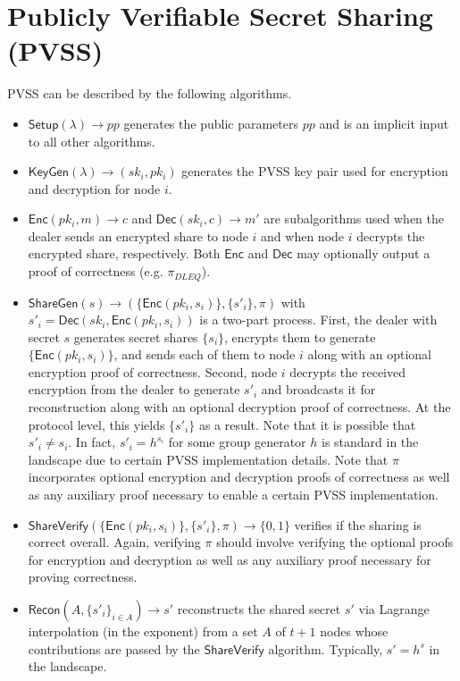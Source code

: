 \documentclass[letterpaper,twocolumn,10pt]{article}
\theoremstyle{definition}
\theoremstyle{remark}
\begin{document}
\fi

\section{Publicly Verifiable Secret Sharing (PVSS)}
\label{appendix:pvss}
PVSS can be described by the following algorithms.
\begin{itemize}
    \item $\mathsf{Setup}(\lambda) \rightarrow pp$ generates the public parameters $pp$ and is an implicit input to all other algorithms.
    \item $\mathsf{KeyGen}(\lambda) \rightarrow (sk_i, pk_i)$ generates the PVSS key pair used for encryption and decryption for node $i$.
    \item $\mathsf{Enc}(pk_i, m) \rightarrow c$ and $\mathsf{Dec}(sk_i, c) \rightarrow m'$ are subalgorithms used when the dealer sends an encrypted share to node $i$ and when node $i$ decrypts the encrypted share, respectively. Both $\mathsf{Enc}$ and $\mathsf{Dec}$ may optionally output a proof of correctness (e.g. $\pi_{DLEQ}$).
    \item $\mathsf{ShareGen}(s) \rightarrow (\{\mathsf{Enc}(pk_i, s_i)\}, \{s'_i\}, \pi)$ with $s'_i = \mathsf{Dec}(sk_i, \mathsf{Enc}(pk_i, s_i))$ is a two-part process. First, the dealer with secret $s$ generates secret shares $\{s_i\}$, encrypts them to generate $\{\mathsf{Enc}(pk_i, s_i)\}$, and sends each of them to node $i$ along with an optional encryption proof of correctness. Second, node $i$ decrypts the received encryption from the dealer to generate $s'_i$ and broadcasts it for reconstruction along with an optional decryption proof of correctness. At the protocol level, this yields $\{s'_i\}$ as a result. Note that it is possible that $s'_i \neq s_i$. In fact, $s'_i = h^{s_i}$ for some group generator $h$ is standard in the landscape due to certain PVSS implementation details. Note that $\pi$ incorporates optional encryption and decryption proofs of correctness as well as any auxiliary proof necessary to enable a certain PVSS implementation.
    \item $\mathsf{ShareVerify}(\{\mathsf{Enc}(pk_i, s_i)\}, \{s'_i\}, \pi) \rightarrow \{0, 1\}$ verifies if the sharing is correct overall. Again, verifying $\pi$ should involve verifying the optional proofs for encryption and decryption as well as any auxiliary proof necessary for proving correctness.
    \item $\mathsf{Recon}(A, \{s'_i\}_{i \in A}) \rightarrow s'$ reconstructs the shared secret $s'$ via Lagrange interpolation (in the exponent) from a set $A$ of $t + 1$ nodes whose contributions are passed by the $\mathsf{ShareVerify}$ algorithm. Typically, $s' = h^s$ in the landscape.
\end{itemize}
\end{document}
